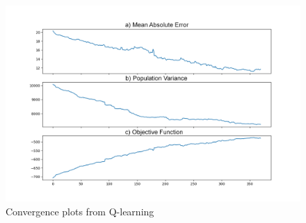 \begin{figure}[h]
\centering
\includegraphics[width=1.0\linewidth]{fig/house-price-q-learning-sampler-v89.png}
\caption{Convergence plots from Q-learning}
\label{qlearn:convergence}
\end{figure}



